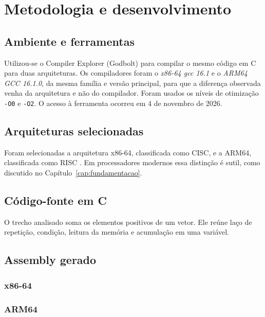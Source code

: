 \chapter{Metodologia e desenvolvimento}
\label{cap:metodologia}

\section{Ambiente e ferramentas}
Utilizou-se o Compiler Explorer (Godbolt) \cite{godbolt} para compilar o mesmo código em C para duas arquiteturas. Os compiladores foram o \textit{x86-64 gcc 16.1} e o \textit{ARM64 GCC 16.1.0}, da mesma família e versão principal, para que a diferença observada venha da arquitetura e não do compilador. Foram usados os níveis de otimização \texttt{-O0} e \texttt{-O2}. O acesso à ferramenta ocorreu em 4 de novembro de 2026.

\section{Arquiteturas selecionadas}
Foram selecionadas a arquitetura x86-64, classificada como CISC, e a ARM64, classificada como RISC \cite[p.~23--28]{stallings2017}\cite[p.~31--36]{tanenbaum2013}. Em processadores modernos essa distinção é sutil, como discutido no Capítulo~\ref{cap:fundamentacao}.

\section{Código-fonte em C}
O trecho analisado soma os elementos positivos de um vetor. Ele reúne laço de repetição, condição, leitura da memória e acumulação em uma variável.



\section{Assembly gerado}
\subsection{x86-64}



\subsection{ARM64}



